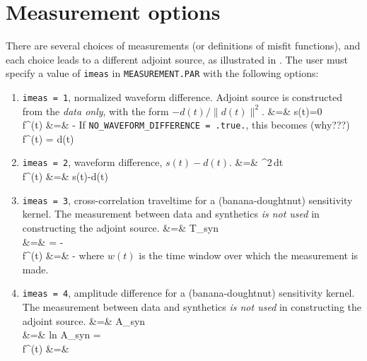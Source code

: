 \documentclass[11pt,titlepage,fleqn]{article}
\begin{document}

\section{Measurement options}
\label{sec:meas}

There are several choices of measurements (or definitions of misfit functions), and each choice leads to a different adjoint source, as illustrated in \citet{Tromp2005}. The user must specify a value of \verb+imeas+ in \verb+MEASUREMENT.PAR+ with the following options:
%
\begin{enumerate}
\item \verb+imeas = 1+, normalized waveform difference. Adjoint source is constructed from the {\em data only}, with the form $-d(t)/\|d(t)\|^2$.
\eqa
\phi &=&  \quad {}\quad s(t)=0 \nn\\
f^\dagger(t) &=& - \nn
\ena
If \verb+NO_WAVEFORM_DIFFERENCE = .true.+, this becomes (why???)
\eq
f^\dagger(t) = d(t) \nn
\en

\item \verb+imeas = 2+, waveform difference, $s(t) - d(t)$.
\eqa
\phi &=&  \int [d(t)-s(t)]^2\,dt  \nn\\
f^\dagger(t) &=& s(t)-d(t) \nn
\ena

\item \verb+imeas = 3+, cross-correlation traveltime for a (banana-doughtnut) sensitivity kernel. The measurement between data and synthetics {\em is not used} in constructing the adjoint source.
\eqa
\phi &=& T_{syn}  \nn\\
\delta \phi &=&  = - 
\quad\quad\quad{}\nn \\
f^\dagger(t) &=& - \nn
\ena
where $w(t)$ is the time window over which the measurement is made.

\item \verb+imeas = 4+, amplitude difference for a (banana-doughtnut) sensitivity kernel. The measurement between data and synthetics {\em is not used} in constructing the adjoint source.
\eqa
\phi &=&  \ln A_{syn}  \nn\\
\delta \phi &=& \delta ln A_{syn} = 
\quad\quad\quad{}
\nn \\
f^\dagger(t) &=&  \nn
\ena


\end{enumerate}
\end{document}
